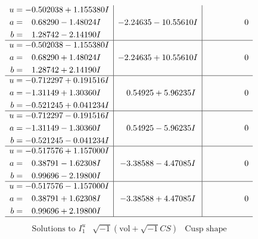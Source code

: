 \documentclass[1p]{elsarticle_modified}
\theoremstyle{definition}
\newcommand{\I}{\sqrt{-1}}
\begin{document}
$$\begin{array}{c|c|c}
\begin{aligned}
u &= -0.502038 + 1.155380 I \\
a &= \phantom{-}0.68290 - 1.48024 I \\
b &= \phantom{-}1.28742 - 2.14190 I\end{aligned}
 & -2.24635 - 10.55610 I & \phantom{-0.000000 } 0 \\ \hline\begin{aligned}
u &= -0.502038 - 1.155380 I \\
a &= \phantom{-}0.68290 + 1.48024 I \\
b &= \phantom{-}1.28742 + 2.14190 I\end{aligned}
 & -2.24635 + 10.55610 I & \phantom{-0.000000 } 0 \\ \hline\begin{aligned}
u &= -0.712297 + 0.191516 I \\
a &= -1.31149 + 1.30360 I \\
b &= -0.521245 + 0.041234 I\end{aligned}
 & \phantom{-}0.54925 + 5.96235 I & \phantom{-0.000000 } 0 \\ \hline\begin{aligned}
u &= -0.712297 - 0.191516 I \\
a &= -1.31149 - 1.30360 I \\
b &= -0.521245 - 0.041234 I\end{aligned}
 & \phantom{-}0.54925 - 5.96235 I & \phantom{-0.000000 } 0 \\ \hline\begin{aligned}
u &= -0.517576 + 1.157000 I \\
a &= \phantom{-}0.38791 - 1.62308 I \\
b &= \phantom{-}0.99696 - 2.19800 I\end{aligned}
 & -3.38588 - 4.47085 I & \phantom{-0.000000 } 0 \\ \hline\begin{aligned}
u &= -0.517576 - 1.157000 I \\
a &= \phantom{-}0.38791 + 1.62308 I \\
b &= \phantom{-}0.99696 + 2.19800 I\end{aligned}
 & -3.38588 + 4.47085 I & \phantom{-0.000000 } 0\\
 \hline 
 \end{array}$$\newpage$$\begin{array}{c|c|c}  
\text{Solutions to }I^u_{1}& \I (\text{vol} + \sqrt{-1}CS) & \text{Cusp shape}\\
 \hline 
\begin{aligned}

\end{aligned}
\end{array}$$
\end{document}
